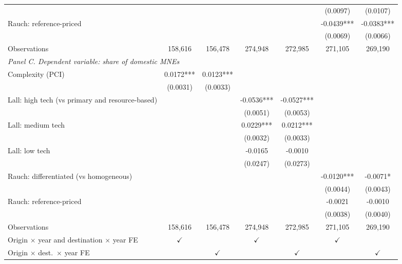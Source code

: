 \begin{tabular}{lcccccc}
 &  &  &  &  & (0.0097) & (0.0107) \\
Rauch: reference-priced &  &  &  &  & -0.0439*** & -0.0383*** \\
 &  &  &  &  & (0.0069) & (0.0066) \\
Observations & 158,616 & 156,478 & 274,948 & 272,985 & 271,105 & 269,190 \\
\midrule
\multicolumn{7}{l}{\textit{Panel C. Dependent variable: share of domestic MNEs}} \\
Complexity (PCI) & 0.0172*** & 0.0123*** &  &  &  &  \\
 & (0.0031) & (0.0033) &  &  &  &  \\
Lall: high tech (vs primary and resource-based) &  &  & -0.0536*** & -0.0527*** &  &  \\
 &  &  & (0.0051) & (0.0053) &  &  \\
Lall: medium tech &  &  & 0.0229*** & 0.0212*** &  &  \\
 &  &  & (0.0032) & (0.0033) &  &  \\
Lall: low tech &  &  & -0.0165 & -0.0010 &  &  \\
 &  &  & (0.0247) & (0.0273) &  &  \\
Rauch: differentiated (vs homogeneous) &  &  &  &  & -0.0120*** & -0.0071* \\
 &  &  &  &  & (0.0044) & (0.0043) \\
Rauch: reference-priced &  &  &  &  & -0.0021 & -0.0010 \\
 &  &  &  &  & (0.0038) & (0.0040) \\
Observations & 158,616 & 156,478 & 274,948 & 272,985 & 271,105 & 269,190 \\
\hline
Origin $\times$ year and destination $\times$ year FE & $\checkmark$ &  & $\checkmark$ &  & $\checkmark$ &  \\
Origin $\times$ dest.\ $\times$ year FE &  & $\checkmark$ &  & $\checkmark$ &  & $\checkmark$ \\
\hline
\end{tabular}
